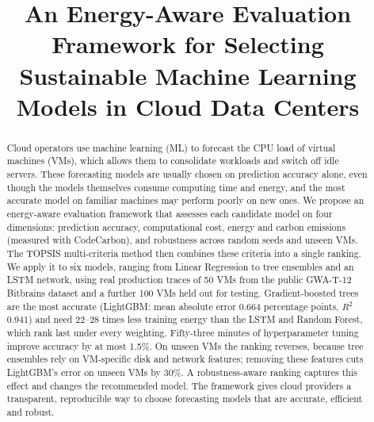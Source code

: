 \documentclass[conference,letterpaper,10pt]{IEEEtran}
\begin{document}
\title{An Energy-Aware Evaluation Framework for Selecting Sustainable Machine Learning Models in Cloud Data Centers}

\author{
}

\maketitle

\begin{abstract}
Cloud operators use machine learning (ML) to forecast the CPU load of virtual machines (VMs), which allows them to consolidate workloads and switch off idle servers. These forecasting models are usually chosen on prediction accuracy alone, even though the models themselves consume computing time and energy, and the most accurate model on familiar machines may perform poorly on new ones. We propose an energy-aware evaluation framework that assesses each candidate model on four dimensions: prediction accuracy, computational cost, energy and carbon emissions (measured with CodeCarbon), and robustness across random seeds and unseen VMs. The TOPSIS multi-criteria method then combines these criteria into a single ranking. We apply it to six models, ranging from Linear Regression to tree ensembles and an LSTM network, using real production traces of 50 VMs from the public GWA-T-12 Bitbrains dataset and a further 100 VMs held out for testing. Gradient-boosted trees are the most accurate (LightGBM: mean absolute error 0.664 percentage points, $R^2$ 0.941) and need 22--28 times less training energy than the LSTM and Random Forest, which rank last under every weighting. Fifty-three minutes of hyperparameter tuning improve accuracy by at most 1.5\%. On unseen VMs the ranking reverses, because tree ensembles rely on VM-specific disk and network features; removing these features cuts LightGBM's error on unseen VMs by 30\%. A robustness-aware ranking captures this effect and changes the recommended model. The framework gives cloud providers a transparent, reproducible way to choose forecasting models that are accurate, efficient and robust.
\end{abstract}
\end{document}
